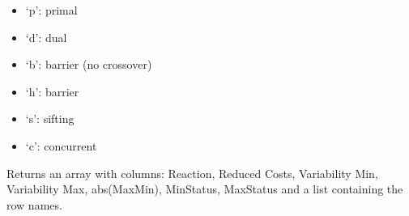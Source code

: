 \documentclass[letterpaper,10pt,english]{sphinxmanual}
\begin{document}
\begin{fulllineitems}
\begin{itemize}
\begin{itemize}
\item {} 
\sphinxAtStartPar
‘p’: primal

\item {} 
\sphinxAtStartPar
‘d’: dual

\item {} 
\sphinxAtStartPar
‘b’: barrier (no crossover)

\item {} 
\sphinxAtStartPar
‘h’: barrier

\item {} 
\sphinxAtStartPar
‘s’: sifting

\item {} 
\sphinxAtStartPar
‘c’: concurrent

\end{itemize}

\end{itemize}

\sphinxAtStartPar
Returns an array with columns: Reaction, Reduced Costs, Variability Min, Variability Max, abs(Max\sphinxhyphen{}Min), MinStatus, MaxStatus and a list containing the row names.

\end{fulllineitems}

\end{document}
